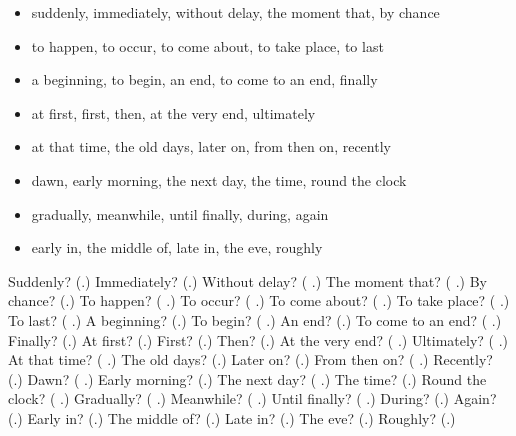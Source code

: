 \begin{itemize}
\raggedright
  \item suddenly, immediately, without delay, the moment that, by chance
  \item to happen, to occur, to come about, to take place, to last
  \item a beginning, to begin, an end, to come to an end, finally
  \item at first, first, then, at the very end, ultimately
  \item at that time, the old days, later on, from then on, recently
  \item dawn, early morning, the next day, the time, round the clock
  \item gradually, meanwhile, until finally, during, again
  \item early in, the middle of, late in, the eve, roughly
\end{itemize}

\begin{tcolorbox}[breakable,colback=teal!4,colframe=teal!35!black,title={Before you move on}]
Suddenly? (\textbf{}.) Immediately? (\textbf{}.) Without delay? (\textbf{ }.) The moment that? (\textbf{ }.) By chance? (\textbf{}.) To happen? (\textbf{ }.) To occur? (\textbf{ }.) To come about? (\textbf{  }.) To take place? (\textbf{ }.) To last? (\textbf{ }.) A beginning? (\textbf{}.) To begin? (\textbf{ }.) An end? (\textbf{}.) To come to an end? (\textbf{ }.) Finally? (\textbf{}.) At first? (\textbf{}.) First? (\textbf{}.) Then? (\textbf{}.) At the very end? (\textbf{ }.) Ultimately? (\textbf{ }.) At that time? (\textbf{  }.) The old days? (\textbf{}.) Later on? (\textbf{}.) From then on? (\textbf{  }.) Recently? (\textbf{}.) Dawn? (\textbf{ }.) Early morning? (\textbf{}.) The next day? (\textbf{  }.) The time? (\textbf{}.) Round the clock? (\textbf{ }.) Gradually? (\textbf{ }.) Meanwhile? (\textbf{  }.) Until finally? (\textbf{ }.) During? (\textbf{}.) Again? (\textbf{}.) Early in? (\textbf{}.) The middle of? (\textbf{}.) Late in? (\textbf{}.) The eve? (\textbf{}.) Roughly? (\textbf{}.)
\end{tcolorbox}
